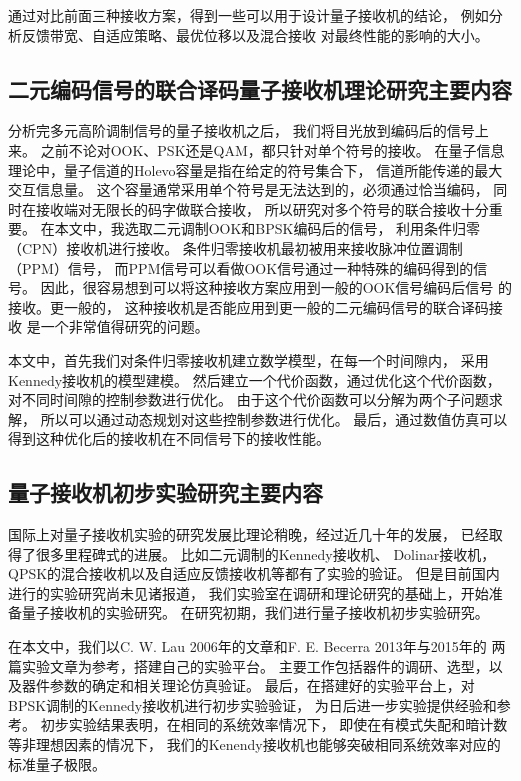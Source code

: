通过对比前面三种接收方案，得到一些可以用于设计量子接收机的结论，
例如分析反馈带宽、自适应策略、最优位移以及混合接收
对最终性能的影响的大小。

\subsection{二元编码信号的联合译码量子接收机理论研究主要内容}

分析完多元高阶调制信号的量子接收机之后，
我们将目光放到编码后的信号上来。
之前不论对OOK、PSK还是QAM，都只针对单个符号的接收。
在量子信息理论中，量子信道的Holevo容量是指在给定的符号集合下，
信道所能传递的最大交互信息量。
这个容量通常采用单个符号是无法达到的，必须通过恰当编码，
同时在接收端对无限长的码字做联合接收，
所以研究对多个符号的联合接收十分重要\cite{holevo1996capacity,hausladen1996classical}。
在本文中，我选取二元调制OOK和BPSK编码后的信号，
利用条件归零（CPN）接收机进行接收。
条件归零接收机最初被用来接收脉冲位置调制（PPM）信号\cite{dolinar1982near}，
而PPM信号可以看做OOK信号通过一种特殊的编码得到的信号。
因此，很容易想到可以将这种接收方案应用到一般的OOK信号编码后信号
的接收。更一般的，
这种接收机是否能应用到更一般的二元编码信号的联合译码接收
是一个非常值得研究的问题。

本文中，首先我们对条件归零接收机建立数学模型，在每一个时间隙内，
采用Kennedy接收机的模型建模。
然后建立一个代价函数，通过优化这个代价函数，
对不同时间隙的控制参数进行优化。
由于这个代价函数可以分解为两个子问题求解，
所以可以通过动态规划对这些控制参数进行优化。
最后，通过数值仿真可以得到这种优化后的接收机在不同信号下的接收性能。

\subsection{量子接收机初步实验研究主要内容}
国际上对量子接收机实验的研究发展比理论稍晚，经过近几十年的发展，
已经取得了很多里程碑式的进展。
比如二元调制的Kennedy接收机\cite{lau2006binary}、
Dolinar接收机\cite{lau2006binary,cook2007optical}，
QPSK的混合接收机以及自适应反馈接收机等都有了实验的验证\cite{muller2012quadrature,becerra2013experimental}。
但是目前国内进行的实验研究尚未见诸报道，
我们实验室在调研和理论研究的基础上，开始准备量子接收机的实验研究。
在研究初期，我们进行量子接收机初步实验研究。

在本文中，我们以C. W. Lau 2006年的文章和F. E. Becerra 2013年与2015年的
两篇实验文章为参考\cite{lau2006binary,becerra2013experimental,becerra2015photon}，搭建自己的实验平台。
主要工作包括器件的调研、选型，以及器件参数的确定和相关理论仿真验证。
最后，在搭建好的实验平台上，对BPSK调制的Kennedy接收机进行初步实验验证，
为日后进一步实验提供经验和参考。
初步实验结果表明，在相同的系统效率情况下，
即使在有模式失配和暗计数等非理想因素的情况下，
我们的Kenendy接收机也能够突破相同系统效率对应的标准量子极限。

 

